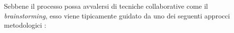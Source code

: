 Sebbene il processo possa avvalersi di tecniche collaborative come il \textit{brainstorming}, esso viene tipicamente guidato da uno dei seguenti approcci metodologici  \cite{libro-threat-modelling-designin-for-security}:


